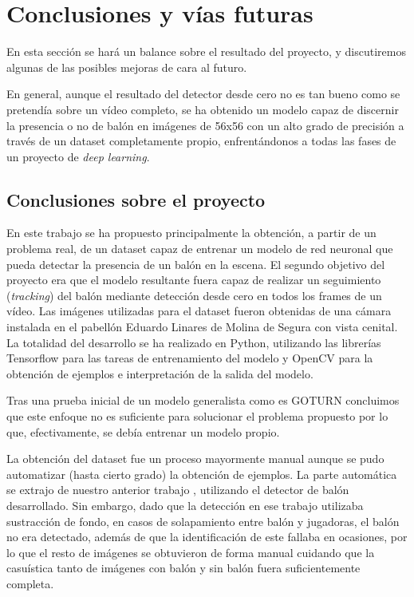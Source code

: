\section{Conclusiones y vías futuras}
En esta sección se hará un balance sobre el resultado del proyecto, y discutiremos algunas de las posibles mejoras de cara al futuro. 

En general, aunque el resultado del detector desde cero no es tan bueno como se pretendía sobre un vídeo completo, se ha obtenido un modelo capaz de discernir la presencia o no de balón en imágenes de 56x56 con un alto grado de precisión a través de un dataset completamente propio, enfrentándonos a todas las fases de un proyecto de \textit{deep learning}.

\subsection{Conclusiones sobre el proyecto}

En este trabajo se ha propuesto principalmente la obtención, a partir de un problema real, de un dataset capaz de entrenar un modelo de red neuronal que pueda detectar la presencia de un balón en la escena. El segundo objetivo del proyecto era que el modelo resultante fuera capaz de realizar un seguimiento (\textit{tracking}) del balón mediante detección desde cero en todos los frames de un vídeo. Las imágenes utilizadas para el dataset fueron obtenidas de una cámara instalada en el pabellón Eduardo Linares de Molina de Segura con vista cenital. La totalidad del desarrollo se ha realizado en Python, utilizando las librerías Tensorflow para las tareas de entrenamiento del modelo y OpenCV para la obtención de ejemplos e interpretación de la salida del modelo.

Tras una prueba inicial de un modelo generalista como es GOTURN concluimos que este enfoque no es suficiente para solucionar el problema propuesto por lo que, efectivamente, se debía entrenar un modelo propio.

La obtención del dataset fue un proceso mayormente manual aunque se pudo automatizar (hasta cierto grado) la obtención de ejemplos. La parte automática se extrajo de nuestro anterior trabajo \cite{tfg}, utilizando el detector de balón desarrollado. Sin embargo, dado que la detección en ese trabajo utilizaba sustracción de fondo, en casos de solapamiento entre balón y jugadoras, el balón no era detectado, además de que la identificación de este fallaba en ocasiones, por lo que el resto de imágenes se obtuvieron de forma manual cuidando que la casuística tanto de imágenes con balón y sin balón fuera suficientemente completa.

